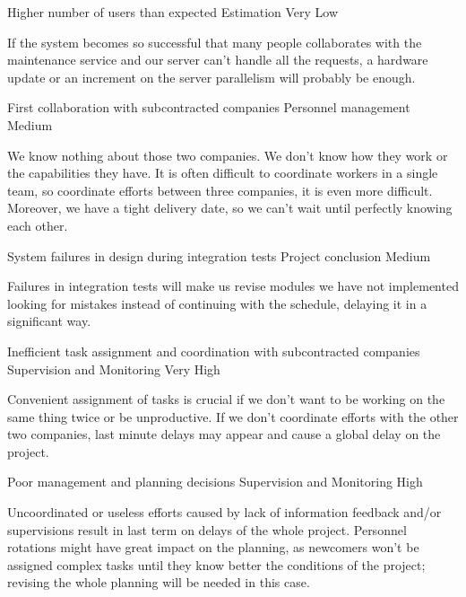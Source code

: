 \begin{risk}[riskUserLoad]{Higher number of users than expected}
\riskcat Estimation
 Very Low

If the system becomes so successful that many people collaborates with the maintenance service and our server can't handle all the requests, a hardware update or an increment on the server parallelism will probably be enough.
\end{risk}

\begin{risk}[riskCollaboration]{First collaboration with subcontracted companies}
\riskcat Personnel management
 Medium

We know nothing about those two companies. We don't know how they work or the capabilities they have. It is often difficult to coordinate workers in a single team, so coordinate efforts between three companies, it is even more difficult. Moreover, we have a tight delivery date, so we can't wait until perfectly knowing each other.
\end{risk}

\begin{risk}[riskIntegrationTests]{System failures in design during integration tests}
\riskcat Project conclusion
 Medium

Failures in integration tests will make us revise modules we have not implemented looking for mistakes instead of continuing with the schedule, delaying it in a significant way.
\end{risk}

\begin{risk}[riskAssignment]{Inefficient task assignment and coordination with subcontracted companies}
\riskcat Supervision and Monitoring
 Very High

Convenient assignment of tasks is crucial if we don't want to be working on the same thing twice or be unproductive. If we don't coordinate efforts with the other two companies, last minute delays may appear and cause a global delay on the project.
\end{risk}

\begin{risk}[riskManagement]{Poor management and planning decisions}
\riskcat Supervision and Monitoring
 High

Uncoordinated or useless efforts caused by lack of information feedback and/or supervisions result in last term on delays of the whole project. Personnel rotations might have great impact on the planning, as newcomers won't be assigned complex tasks until they know better the conditions of the project; revising the whole planning will be needed in this case.
\end{risk}

